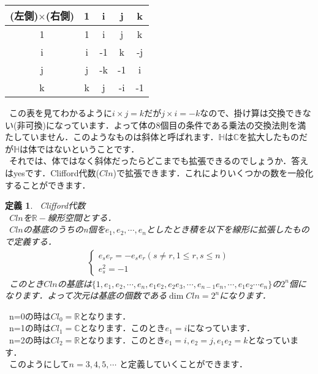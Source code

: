 \documentclass{jreport}
\theoremstyle{idefinition}
\newtheorem{idefi}{定義}[section]
\begin{document}
\begin{center}
\begin{tabular}{|c|c|c|c|c|}\hline
(左側)$\times$(右側) & 1 & i & j & k \\\hline
1 & 1 & i & j & k \\\hline
i & i & -1 & k & -j \\\hline
j & j & -k & -1 & i \\\hline
k & k & j & -i & -1 \\\hline
\end{tabular}
\end{center}


\ この表を見てわかるように$i\times j=k$だが$j\times i=-k$なので、掛け算は交換できない(非可換)になっています．よって体の8個目の条件である乗法の交換法則を満たしていません．このようなものは斜体と呼ばれます．$\mathbb{H}$は$\mathbb{C}$を拡大したものだが$\mathbb{H}$は体ではないということです．\\ 

\ それでは、体ではなく斜体だったらどこまでも拡張できるのでしょうか．答えはyesです．Clifford代数($Cln$)で拡張できます．これによりいくつかの数を一般化することができます．\\

\begin{idefi}
\ Clifford代数\\
\ $Cln$を$\mathbb{R}-$線形空間とする．\\
\ $Cln$の基底のうちのn個を$e_1,e_2,\cdots ,e_n$としたとき積を以下を線形に拡張したもので定義する．\\
\begin{eqnarray}
\left\{
\begin{array}{l}
e_s e_r=-e_s e_r (s\neq r , 1\leq r,s \leq n)\\
e_s^2=-1
\end{array}
\right.
\end{eqnarray}
\ このとき$Cln$の基底は$\{1,e_1,e_2,\cdots,e_n,e_1e_2,e_2e_3,\cdots,e_{n-1}e_n,\cdots,e_1e_2\cdots e_n \}$の$2^n$個になります．よって次元は基底の個数である$\dim{Cln}=2^n$になります．\\
\end{idefi}

\ n=0の時は$Cl_0=\mathbb{R}$となります．\\
\ n=1の時は$Cl_1=\mathbb{C}$となります．このとき$e_1=i$になっています．\\
\ n=2の時は$Cl_2=\mathbb{R}$となります．このとき$e_1=i,e_2=j,e_1e_2=k$となっています．\\
\ このようにして$n=3,4,5,\cdots$ と定義していくことができます．\\
\end{document}
